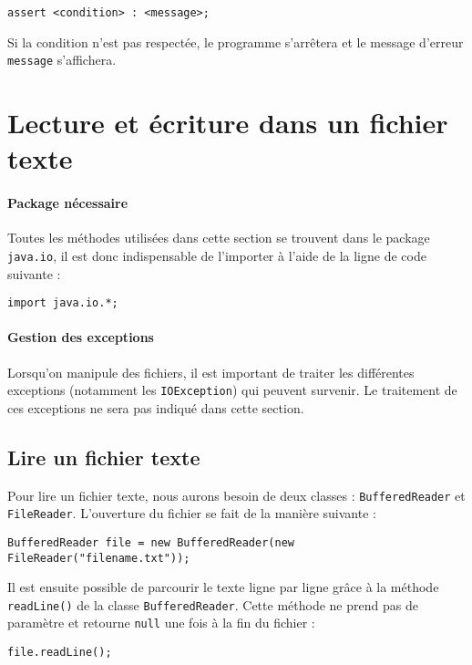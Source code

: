 \begin{lstlisting}
assert <condition> : <message>;
\end{lstlisting}

Si la condition n'est pas respectée, le programme s'arrêtera et le message d'erreur \lstinline|message| s'affichera.

\section{Lecture et écriture dans un fichier texte}
\paragraph{Package nécessaire }
Toutes les méthodes utilisées dans cette section se trouvent dans le package \lstinline|java.io|, il est donc
indispensable de l'importer à l'aide de la ligne de code suivante :

\begin{lstlisting}
import java.io.*;
\end{lstlisting}

\paragraph{Gestion des exceptions } Lorsqu'on manipule des fichiers, il est important de traiter les différentes exceptions (notamment les \lstinline|IOException|) qui peuvent survenir. Le traitement de ces exceptions ne sera pas indiqué dans cette section.

\subsection{Lire un fichier texte}
Pour lire un fichier texte, nous aurons besoin de deux classes : \lstinline|BufferedReader| et \lstinline|FileReader|. L'ouverture du fichier se fait de la manière suivante :

\begin{lstlisting}
BufferedReader file = new BufferedReader(new FileReader("filename.txt"));
\end{lstlisting}

Il est ensuite possible de parcourir le texte ligne par ligne grâce à la méthode \lstinline|readLine()| de la classe \lstinline|BufferedReader|. Cette méthode ne prend pas de paramètre et retourne \lstinline|null| une fois à la fin du fichier :

\begin{lstlisting}
file.readLine();
\end{lstlisting}


